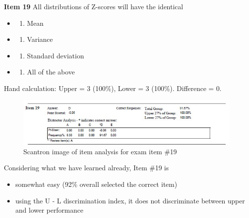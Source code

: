 \documentclass[
  english,
]{book}
\providecommand{\tightlist}{%
  \setlength{\itemsep}{0pt}\setlength{\parskip}{0pt}}
\begin{document}
\textbf{Item 19} All distributions of Z-scores will have the identical

\begin{itemize}
\item
  \begin{enumerate}
  \def\labelenumi{\alph{enumi})}
  \tightlist
  \item
    Mean
  \end{enumerate}
\item
  \begin{enumerate}
  \def\labelenumi{\alph{enumi})}
  \setcounter{enumi}{1}
  \tightlist
  \item
    Variance
  \end{enumerate}
\item
  \begin{enumerate}
  \def\labelenumi{\alph{enumi})}
  \setcounter{enumi}{2}
  \tightlist
  \item
    Standard deviation
  \end{enumerate}
\item
  \begin{enumerate}
  \def\labelenumi{\alph{enumi})}
  \setcounter{enumi}{3}
  \tightlist
  \item
    All of the above
  \end{enumerate}
\end{itemize}

Hand calculation: Upper = 3 (100\%), Lower = 3 (100\%). Difference = 0.

\begin{figure}
\centering
\includegraphics{images/ItemAnalExam/Item19.jpg}
\caption{Scantron image of item analysis for exam item \#19}
\end{figure}

Considering what we have learned already, Item \#19 is

\begin{itemize}
\tightlist
\item
  somewhat easy (92\% overall selected the correct item)
\item
  using the U - L discrimination index, it does not discriminate between upper and lower performance
\end{itemize}
\end{document}
